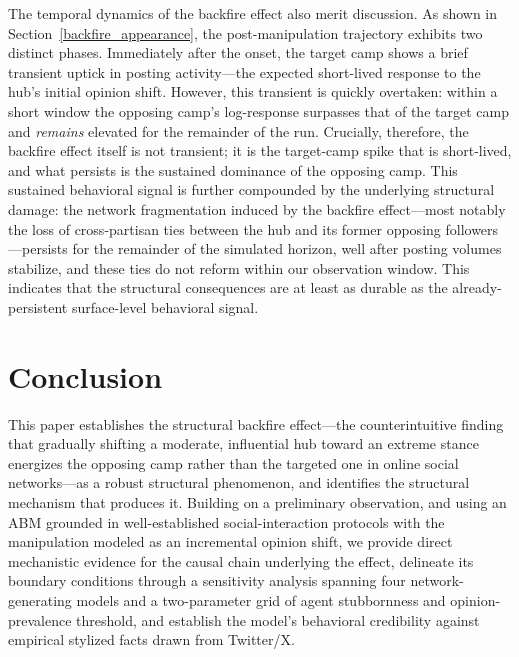 \documentclass[pdflatex,sn-mathphys-num]{sn-jnl}%
\theoremstyle{thmstyleone}%
\theoremstyle{thmstyletwo}%
\theoremstyle{thmstylethree}%
\def\Dgreen{\color[rgb]{0.02,0.55,0.04}}
\begin{document}
\Dgreen
The temporal dynamics of the backfire effect 
also merit discussion. As shown in Section~\ref{backfire_appearance}, 
the post-manipulation trajectory exhibits two distinct phases. 
Immediately after the onset, the target camp shows a brief 
transient uptick in posting activity---the expected short-lived 
response to the hub's initial opinion shift. However, 
this transient is quickly overtaken: within a short window 
the opposing camp's log-response surpasses that of 
the target camp and \emph{remains} elevated for 
the remainder of the run. Crucially, therefore, 
the backfire effect itself is not transient; it is 
the target-camp spike that is short-lived, and 
what persists is the sustained dominance of the opposing camp. 
This sustained behavioral signal is further compounded 
by the underlying structural damage: the network
fragmentation induced by the backfire effect---most
notably the loss of cross-partisan
ties between the hub and its former opposing
followers---persists for the remainder of the simulated horizon,
well after posting volumes stabilize, and these ties do not reform
within our observation window. This indicates that the structural consequences
are at least as durable as the already-persistent surface-level behavioral signal.
\par


\section{Conclusion}
\Dgreen
This paper establishes the structural backfire effect---the
counterintuitive finding that gradually shifting a moderate, influential hub
toward an extreme stance energizes the opposing camp rather than the targeted one
in online social networks---as a robust structural phenomenon, and
identifies the structural mechanism that produces it. Building on a
preliminary observation, and using an ABM grounded in well-established
social-interaction protocols with the manipulation modeled as an incremental opinion shift,
we provide
direct mechanistic evidence for the causal chain underlying the effect, delineate
its boundary conditions through a sensitivity analysis spanning four
network-generating models and a two-parameter grid of agent stubbornness and
opinion-prevalence threshold, and establish the model's behavioral credibility
against empirical stylized facts drawn from Twitter/X.
\par
\end{document}
